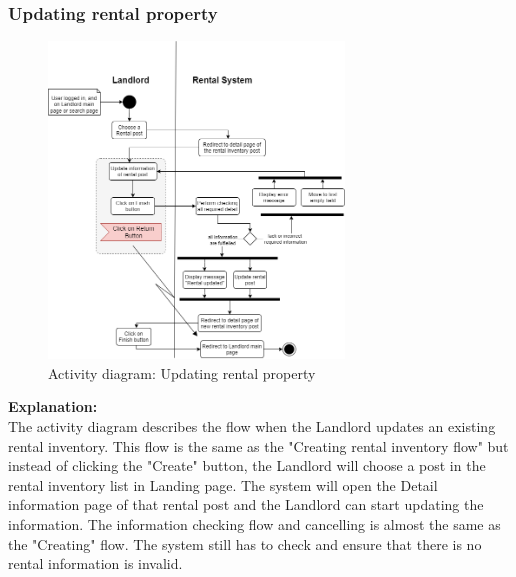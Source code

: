 \subsubsection{Updating rental property}
\begin{figure}[H]
    \centering
    \includegraphics[width=0.7\textwidth]{Images/Activity/ac_diag_update_rental.png}
    \caption{Activity diagram: Updating rental property}
    \label{fig:update-rental}
\end{figure}
\noindent \textbf{Explanation:}\\
The activity diagram describes the flow when the Landlord updates an existing rental inventory. This flow is the same as the "Creating rental inventory flow" but instead of clicking the "Create" button, the Landlord will choose a post in the rental inventory list in Landing page. The system will open the Detail information page of that rental post and the Landlord can start updating the information. The information checking flow and cancelling is almost the same as the "Creating" flow. The system still has to check and ensure that there is no rental information is invalid.


\newpage
